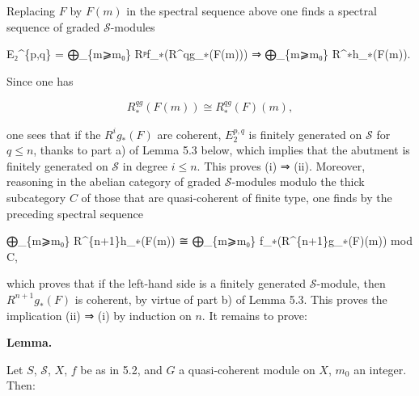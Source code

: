 \documentclass[
]{article}
\newenvironment{Shaded}{}{}
\newcommand{\NormalTok}[1]{#1}
\begin{document}
Replacing \(F\) by \(F(m)\) in the spectral sequence above one finds a
spectral sequence of graded \(\mathcal{S}\)-modules

\begin{Shaded}
\begin{Highlighting}[]
\NormalTok{E₂\^{}\{p,q\} = ⨁\_\{m⩾m₀\} Rᵖf\_∗(R\^{}qg\_∗(F(m))) ⇒ ⨁\_\{m⩾m₀\} R\^{}∗h\_∗(F(m)).}
\end{Highlighting}
\end{Shaded}

Since one has

\[
R^{qg}_{\ast}(F(m)) \cong R^{qg}_{\ast}(F)(m),
\]

one sees that if the \(R^{i}g_{\ast}(F)\) are coherent, \(E^{p,q}_{2}\)
is finitely generated on \(\mathcal{S}\) for \(q \leqslant n\), thanks
to part a) of Lemma 5.3 below, which implies that the abutment is
finitely generated on \(\mathcal{S}\) in degree \(i \leqslant n\). This
proves (i) ⇒ (ii). Moreover, reasoning in the abelian category of graded
\(\mathcal{S}\)-modules modulo the thick subcategory \(C\) of those that
are quasi-coherent of finite type, one finds by the preceding spectral
sequence

\begin{Shaded}
\begin{Highlighting}[]
\NormalTok{⨁\_\{m⩾m₀\} R\^{}\{n+1\}h\_∗(F(m)) ≅ ⨁\_\{m⩾m₀\} f\_∗(R\^{}\{n+1\}g\_∗(F)(m)) mod C,}
\end{Highlighting}
\end{Shaded}

which proves that if the left-hand side is a finitely generated
\(\mathcal{S}\)-module, then \(R^{n+1}g_{\ast}(F)\) is coherent, by
virtue of part b) of Lemma 5.3. This proves the implication (ii) ⇒ (i)
by induction on \(n\). It remains to prove:

\textbf{Lemma.}

Let \(S\), \(\mathcal{S}\), \(X\), \(f\) be as in 5.2, and \(G\) a
quasi-coherent module on \(X\), \(m_{0}\) an integer. Then:
\end{document}
